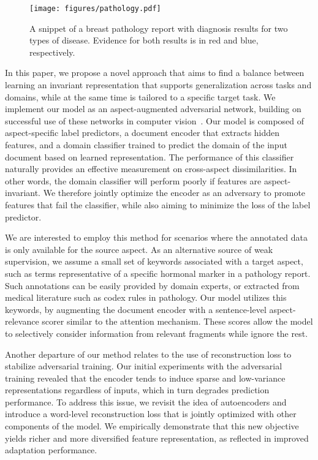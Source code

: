 \begin{figure}[t]
\centering
\texttt{[image: figures/pathology.pdf]}
\caption{A snippet of a breast pathology report with diagnosis results for two types of disease. Evidence for both results is in red and blue, respectively. }\label{fig:pathology}
\end{figure}

In this paper, we propose a novel approach that aims to find a balance between learning an invariant representation that supports generalization across tasks and domains, while at the same time is tailored to a specific target task. We implement our model as an aspect-augmented adversarial network, building on successful use of these networks in computer vision~\cite{ganin2014unsupervised}. Our model is composed of aspect-specific label predictors, a document encoder that extracts hidden features, and a domain classifier trained to predict the domain of the input document based on learned representation. The performance of this classifier naturally provides an effective measurement on cross-aspect dissimilarities. In other words, the domain classifier will perform poorly if features are aspect-invariant. We therefore jointly optimize the encoder as an adversary to promote features that fail the classifier, while also
aiming to minimize the loss of the label predictor. 

We are interested to employ this method for scenarios where the annotated data is only available for the source aspect. As an alternative source of weak supervision, we assume a small set of keywords associated with a target aspect, such as terms representative of a specific hormonal marker in a pathology report. Such annotations can be easily provided by domain experts, or extracted from medical literature such as codex rules in pathology. Our model utilizes this keywords, by augmenting the document encoder with a sentence-level aspect-relevance scorer similar to the attention mechanism. These scores allow the model to selectively consider information from relevant fragments while ignore the rest.

Another departure of our method relates to the use of reconstruction loss to stabilize adversarial 
training. Our initial experiments with the adversarial training revealed that the encoder tends to induce sparse and low-variance representations regardless of inputs, which in turn degrades prediction performance. To address this issue, we revisit the idea of autoencoders and introduce a word-level reconstruction loss that is jointly optimized with other components of the model. We empirically demonstrate that this new objective yields richer and more diversified feature representation, as reflected in improved adaptation performance.

